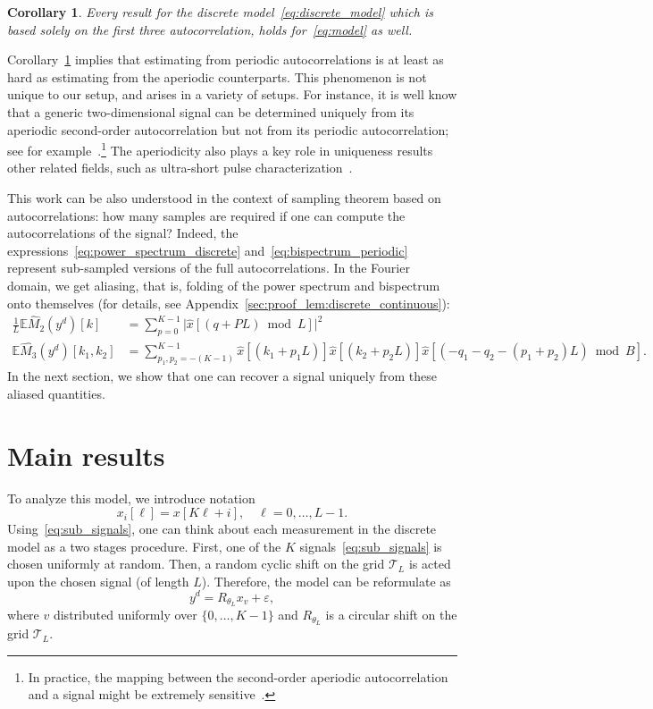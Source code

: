 \documentclass[english,12pt]{article}
\newcommand{\E}{\mathbb{E}}
\newcommand{\T}{\mathcal{T}}
\numberwithin{equation}{section}
\numberwithin{thm}{section} %
\newtheorem{cor}[thm]{Corollary}
\begin{document}
\begin{cor} \label{cor:discrete_contonuous}
	Every result for the discrete model~\eqref{eq:discrete_model} which is based solely on the first three autocorrelation, holds for~\eqref{eq:model} as well.
\end{cor}


Corollary~\ref{cor:discrete_contonuous} implies that estimating from  periodic autocorrelations is at least as hard as estimating from the aperiodic counterparts.
This phenomenon is not unique to our setup, and arises in a variety of setups.  
For instance, it is well know that a generic two-dimensional signal can be determined uniquely from its aperiodic second-order autocorrelation but not from its periodic autocorrelation; see for example~\cite{hayes1982reconstruction}.\footnote{In practice, the mapping between the second-order aperiodic autocorrelation and a signal might be extremely sensitive~\cite{barnett2018geometry}.} The aperiodicity also plays a key role in uniqueness results other related fields, such as ultra-short pulse characterization~\cite{bendory2018signal}. 

This work can be also understood in the context of sampling theorem based on autocorrelations: how many samples are required if one can compute the autocorrelations of the signal?
 Indeed, the expressions~\eqref{eq:power_spectrum_discrete} and~\eqref{eq:bispectrum_periodic} represent sub-sampled versions of the full autocorrelations. In the Fourier domain, we get aliasing, that is, folding of the power spectrum and bispectrum onto themselves (for details, see Appendix~\ref{sec:proof_lem:discrete_continuous}):
\begin{align}
\frac{1}{L}\E \hat{M}_2(y^d)[k] &=  \sum_{p=0}^{K-1} \vert \hat{x}[(q+PL)\bmod L]\vert^2 \\
\E \hat{M_3}(y^d)[k_1,k_2] &=  
 \sum_{p_1,p_2=-(K-1)}^{K-1} \hat{x}[(k_1 + p_1L)] \hat{x}[(k_2 + p_2L)]\hat{x}[(-q_1-q_2 - (p_1+p_2)L)\bmod B]. \nonumber
\end{align}
In the next section, we show that one can recover a signal uniquely from these aliased quantities. 

\section{Main results}
\label{sec:theory}

To analyze this model, we introduce notation
\begin{equation} \label{eq:sub_signals}
x_i[\ell] = x[K\ell + i], \quad \ell=0,\ldots,L-1.
\end{equation}
Using~\eqref{eq:sub_signals}, one can think about each measurement in the discrete model 
as a two stages procedure. First, one of the $K$ signals~\eqref{eq:sub_signals} is chosen uniformly at random. Then, a random cyclic shift on the grid $\T_L$ is acted upon the chosen signal (of length $L$).
Therefore, the model can be reformulate  as 
\begin{equation} \label{eq:heter_mra}
y^d =  R_{\theta_{L}} x_{v} + \varepsilon,
\end{equation}
where $v$ distributed uniformly over $\{0,\ldots,K-1\}$ and $R_{\theta_L}$ is a circular shift on the grid $\T_L$. 
\end{document}
